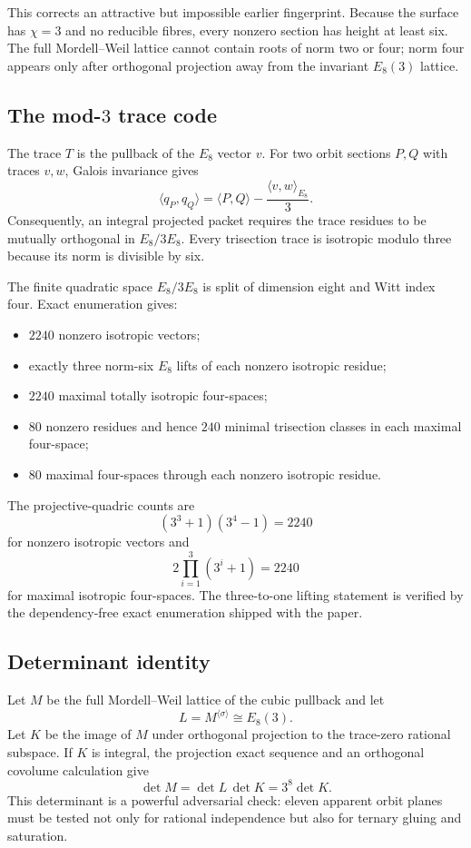 This corrects an attractive but impossible earlier fingerprint.  Because the
surface has $\chi=3$ and no reducible fibres, every nonzero section has height
at least six.  The full Mordell--Weil lattice cannot contain roots of norm two
or four; norm four appears only after orthogonal projection away from the
invariant $E_8(3)$ lattice.

\subsection{The mod-$3$ trace code}

The trace $T$ is the pullback of the $E_8$ vector $v$.  For two orbit sections
$P,Q$ with traces $v,w$, Galois invariance gives
\[
\boxed{
\langle q_P,q_Q\rangle
=
\langle P,Q\rangle-\frac{\langle v,w\rangle_{E_8}}{3}.
}
\]
Consequently, an integral projected packet requires the trace residues to be
mutually orthogonal in $E_8/3E_8$.  Every trisection trace is isotropic modulo
three because its norm is divisible by six.

The finite quadratic space $E_8/3E_8$ is split of dimension eight and Witt
index four.  Exact enumeration gives:
\begin{itemize}[leftmargin=*]
\item $2240$ nonzero isotropic vectors;
\item exactly three norm-six $E_8$ lifts of each nonzero isotropic residue;
\item $2240$ maximal totally isotropic four-spaces;
\item $80$ nonzero residues and hence $240$ minimal trisection classes in each maximal four-space;
\item $80$ maximal four-spaces through each nonzero isotropic residue.
\end{itemize}
The projective-quadric counts are
\[
(3^3+1)(3^4-1)=2240
\]
for nonzero isotropic vectors and
\[
2\prod_{i=1}^{3}(3^i+1)=2240
\]
for maximal isotropic four-spaces.  The three-to-one lifting statement is
verified by the dependency-free exact enumeration shipped with the paper.

\subsection{Determinant identity}

Let $M$ be the full Mordell--Weil lattice of the cubic pullback and let
\[
L=M^{\langle\sigma\rangle}\cong E_8(3).
\]
Let $K$ be the image of $M$ under orthogonal projection to the trace-zero
rational subspace.  If $K$ is integral, the projection exact sequence and an
orthogonal covolume calculation give
\[
\boxed{\det M=\det L\,\det K=3^8\det K.}
\]
This determinant is a powerful adversarial check: eleven apparent orbit
planes must be tested not only for rational independence but also for ternary
gluing and saturation.

